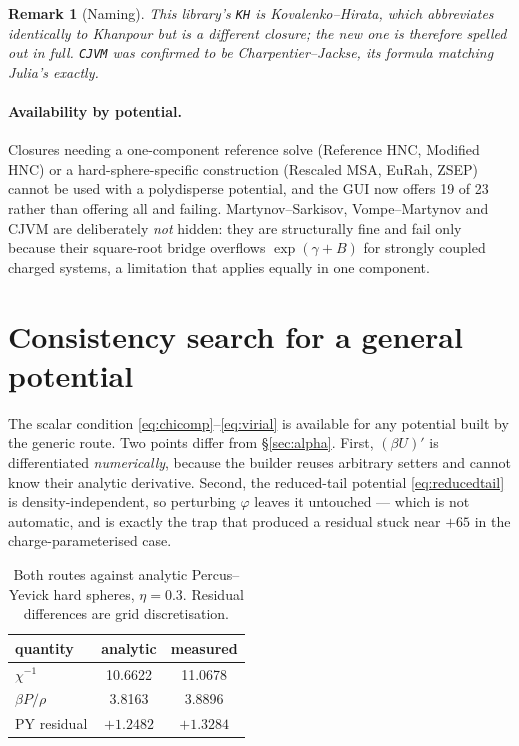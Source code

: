 \documentclass[11pt,a4paper]{article}
\newtheorem{remark}{Remark}
\newcommand{\code}[1]{\texttt{#1}}
\begin{document}
\begin{remark}[Naming]
This library's \code{KH} is Kovalenko--Hirata, which abbreviates identically
to Khanpour but is a different closure; the new one is therefore spelled out
in full. \code{CJVM} was confirmed to be Charpentier--Jackse, its formula
matching Julia's exactly.
\end{remark}

\paragraph{Availability by potential.} Closures needing a one-component
reference solve (Reference HNC, Modified HNC) or a hard-sphere-specific
construction (Rescaled MSA, EuRah, ZSEP) cannot be used with a polydisperse
potential, and the GUI now offers 19 of 23 rather than offering all and
failing. Martynov--Sarkisov, Vompe--Martynov and CJVM are deliberately
\emph{not} hidden: they are structurally fine and fail only because their
square-root bridge overflows $\exp(\gamma+B)$ for strongly coupled charged
systems, a limitation that applies equally in one component.

\section{Consistency search for a general potential}
\label{sec:genericalpha}

The scalar condition \eqref{eq:chicomp}--\eqref{eq:virial} is available for
any potential built by the generic route. Two points differ from
\S\ref{sec:alpha}. First, $(\beta U)'$ is differentiated \emph{numerically},
because the builder reuses arbitrary setters and cannot know their analytic
derivative. Second, the reduced-tail potential \eqref{eq:reducedtail} is
density-independent, so perturbing $\varphi$ leaves it untouched --- which is
not automatic, and is exactly the trap that produced a residual stuck near
$+65$ in the charge-parameterised case.

\begin{table}[htbp]
\centering
\caption{Both routes against analytic Percus--Yevick hard spheres,
$\eta=0.3$. Residual differences are grid discretisation.}
\begin{tabular}{lcc}
\toprule
quantity & analytic & measured\\
\midrule
$\chi^{-1}$      & 10.6622 & 11.0678\\
$\beta P/\rho$   & 3.8163  & 3.8896\\
PY residual      & $+1.2482$ & $+1.3284$\\
\bottomrule
\end{tabular}
\end{table}
\end{document}
